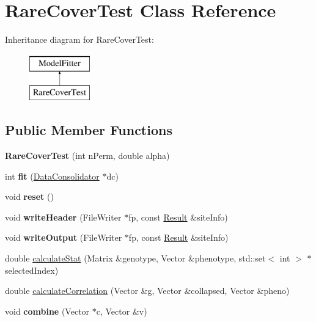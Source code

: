 \hypertarget{classRareCoverTest}{\section{Rare\-Cover\-Test Class Reference}
\label{classRareCoverTest}
}
Inheritance diagram for Rare\-Cover\-Test\-:\begin{figure}[H]
\begin{center}
\leavevmode
\includegraphics[height=2.000000cm]{classRareCoverTest}
\end{center}
\end{figure}
\subsection*{Public Member Functions}
\begin{DoxyCompactItemize}
\item 
\hypertarget{classRareCoverTest_a65a7be8d4f72226c2e378251a1110642}{{\bfseries Rare\-Cover\-Test} (int n\-Perm, double alpha)}\label{classRareCoverTest_a65a7be8d4f72226c2e378251a1110642}

\item 
\hypertarget{classRareCoverTest_a0c3dd9692b804f5c9ba712fb195161f9}{int {\bfseries fit} (\hyperlink{classDataConsolidator}{Data\-Consolidator} $\ast$dc)}\label{classRareCoverTest_a0c3dd9692b804f5c9ba712fb195161f9}

\item 
\hypertarget{classRareCoverTest_a78626327132047575b9c36f6f0dc5e5f}{void {\bfseries reset} ()}\label{classRareCoverTest_a78626327132047575b9c36f6f0dc5e5f}

\item 
\hypertarget{classRareCoverTest_a2d8d5fd3d311e773b6f974dc6e796b63}{void {\bfseries write\-Header} (File\-Writer $\ast$fp, const \hyperlink{classResult}{Result} \&site\-Info)}\label{classRareCoverTest_a2d8d5fd3d311e773b6f974dc6e796b63}

\item 
\hypertarget{classRareCoverTest_a1af6aae137c2a322f6e7a309bcf67b20}{void {\bfseries write\-Output} (File\-Writer $\ast$fp, const \hyperlink{classResult}{Result} \&site\-Info)}\label{classRareCoverTest_a1af6aae137c2a322f6e7a309bcf67b20}

\item 
double \hyperlink{classRareCoverTest_a425080e90820f33773da8111b641f053}{calculate\-Stat} (Matrix \&genotype, Vector \&phenotype, std\-::set$<$ int $>$ $\ast$selected\-Index)
\item 
double \hyperlink{classRareCoverTest_acbebef2b77dba2dc49eb75ead9425668}{calculate\-Correlation} (Vector \&g, Vector \&collapsed, Vector \&pheno)
\item 
\hypertarget{classRareCoverTest_aa8aeb38d2968517510407a103d7cbaf0}{void {\bfseries combine} (Vector $\ast$c, Vector \&v)}\label{classRareCoverTest_aa8aeb38d2968517510407a103d7cbaf0}

\end{DoxyCompactItemize}
